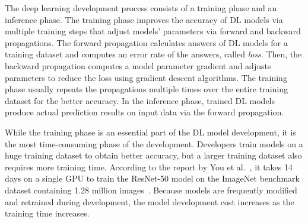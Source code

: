 The deep learning development process consists of a training phase and an
inference phase.
The training phase improves the accuracy of DL models via multiple training
steps that adjust models' parameters via forward and backward propagations. 
The forward propagation calculates answers of DL models for a training dataset
and computes an error rate of the answers, called {\it loss}.
Then, the backward propagation computes a model parameter gradient and adjusts
parameters to reduce the loss using gradient descent algorithms.
The training phase usually repeats the propagations multiple times over the
entire training dataset for the better accuracy.
In the inference phase, trained DL models produce actual prediction results on
input data via the forward propagation.

While the training phase is an essential part of the DL model development, it
is the most time-consuming phase of the development.
Developers train models on a huge training dataset to obtain better accuracy,
but a larger training dataset also requires more training time.
According to the report by You et al.~\cite{imagenettraining2017}, it takes 14
days on a single GPU to train the ResNet-50 model on the ImageNet benchmark
dataset containing 1.28 million images~\cite{imagenet2014}.
Because models are frequently modified and retrained during development, the
model development cost increases as the training time increases.

